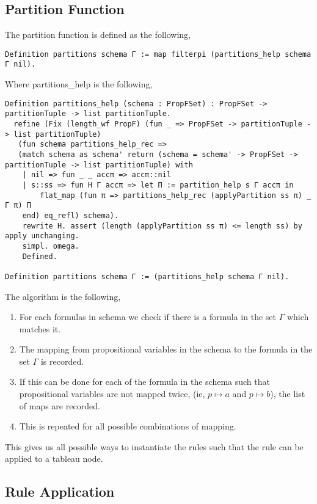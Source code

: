 \documentclass{report}
\theoremstyle{definition}
\begin{document}
\subsection{Partition Function}

The partition function is defined as the following,

\begin{lstlisting}
Definition partitions schema Γ := map filterpi (partitions_help schema Γ nil).
\end{lstlisting}

Where partitions\_help is the following,

\begin{lstlisting}
Definition partitions_help (schema : PropFSet) : PropFSet -> partitionTuple -> list partitionTuple.
  refine (Fix (length_wf PropF) (fun _ => PropFSet -> partitionTuple -> list partitionTuple)
   (fun schema partitions_help_rec =>
   (match schema as schema' return (schema = schema' -> PropFSet -> partitionTuple -> list partitionTuple) with
    | nil => fun _ _ accπ => accπ::nil
    | s::ss => fun H Γ accπ => let Π := partition_help s Γ accπ in
        flat_map (fun π => partitions_help_rec (applyPartition ss π) _ Γ π) Π
    end) eq_refl) schema).
    rewrite H. assert (length (applyPartition ss π) <= length ss) by apply unchanging.
    simpl. omega.
    Defined.

Definition partitions schema Γ := (partitions_help schema Γ nil).
\end{lstlisting}

The algorithm is the following,

\begin{enumerate}
\item For each formulas in schema we check if there is a formula in the set
$\Gamma$ which matches it.
\item The mapping from propositional variables in the schema to the formula in
the set $\Gamma$ is recorded.
\item If this can be done for each of the formula in the schema such that
propositional variables are not mapped twice, (ie, $p \mapsto a$ and $p \mapsto
b$), the list of maps are recorded.
\item This is repeated for all possible combinations of mapping.
\end{enumerate}

This gives us all possible ways to instantiate the rules such that the rule can
be applied to a tableau node.

\subsection{Rule Application}
\end{document}
